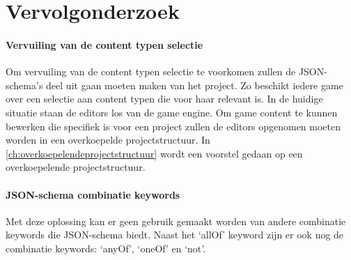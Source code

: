 \section{Vervolgonderzoek}
\paragraph{Vervuiling van de content typen selectie}
Om vervuiling van de content typen selectie te voorkomen zullen de JSON-schema’s deel uit gaan moeten maken van het project. Zo beschikt iedere game over een selectie aan content typen die voor haar relevant is. In de huidige situatie staan de editors los van de game engine. Om game content te kunnen bewerken die specifiek is voor een project zullen de editors opgenomen moeten worden in een overkoepelde projectstructuur. In \autoref{ch:overkoepelendeprojectstructuur} wordt een voorstel gedaan op een overkoepelende projectstructuur.

\paragraph{JSON-schema combinatie keywords}
Met deze oplossing kan er geen gebruik gemaakt worden van andere combinatie keywords die JSON-schema biedt. Naast het ‘allOf’ keyword zijn er ook nog de combinatie keywords: ‘anyOf’, ‘oneOf’ en ‘not’.